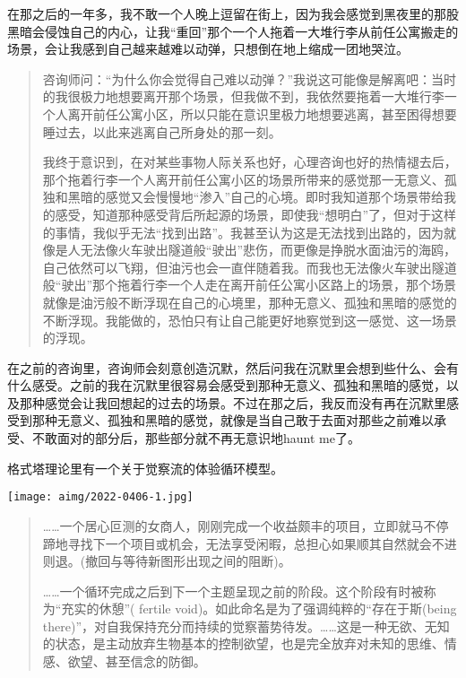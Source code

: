 在那之后的一年多，我不敢一个人晚上逗留在街上，因为我会感觉到黑夜里的那股黑暗会侵蚀自己的内心，让我“重回”那个一个人拖着一大堆行李从前任公寓搬走的场景，会让我感到自己越来越难以动弹，只想倒在地上缩成一团地哭泣。

\blockquote{
咨询师问：“为什么你会觉得自己难以动弹？”我说这可能像是解离吧：当时的我很极力地想要离开那个场景，但我做不到，我依然要拖着一大堆行李一个人离开前任公寓小区，所以只能在意识里极力地想要逃离，甚至困得想要睡过去，以此来逃离自己所身处的那一刻。

我终于意识到，在对某些事物\pozhehao{}人际关系也好，心理咨询也好\pozhehao{}的热情褪去后，那个拖着行李一个人离开前任公寓小区的场景所带来的感觉\pozhehao{}那一无意义、孤独和黑暗的感觉又会慢慢地“渗入”自己的心境。即时我知道那个场景带给我的感受，知道那种感受背后所起源的场景，即使我“想明白”了，但对于这样的事情，我似乎无法“找到出路”。我甚至认为这是无法找到出路的，因为就像是人无法像火车驶出隧道般“驶出”悲伤，而更像是挣脱水面油污的海鸥，自己依然可以飞翔，但油污也会一直伴随着我。而我也无法像火车驶出隧道般“驶出”那个拖着行李一个人走在离开前任公寓小区路上的场景，那个场景就像是油污般不断浮现在自己的心境里，那种无意义、孤独和黑暗的感觉的不断浮现。我能做的，恐怕只有让自己能更好地察觉到这一感觉、这一场景的浮现。

}

在之前的咨询里，咨询师会刻意创造沉默，然后问我在沉默里会想到些什么、会有什么感受。之前的我在沉默里很容易会感受到那种无意义、孤独和黑暗的感觉，以及那种感觉会让我回想起的过去的场景。不过在那之后，我反而没有再在沉默里感受到那种无意义、孤独和黑暗的感觉，就像是当自己敢于去面对那些之前难以承受、不敢面对的部分后，那些部分就不再无意识地haunt me了。

格式塔理论里有一个关于觉察流的体验循环模型。

\noindent\begin{minipage}{\linewidth}
    \centering
    \vspace{3pt}
    \texttt{[image: aimg/2022-0406-1.jpg]}
    \vspace{3pt}
\end{minipage}

\blockquote{
……一个居心叵测的女商人，刚刚完成一个收益颇丰的项目，立即就马不停蹄地寻找下一个项目或机会，无法享受闲暇，总担心如果顺其自然就会不进则退。(撤回与等待新图形出现之间的阻断)。

……一个循环完成之后到下一个主题呈现之前的阶段。这个阶段有时被称为“充实的休憩”( fertile void)。如此命名是为了强调纯粹的“存在于斯(being there)”，对自我保持充分而持续的觉察蓄势待发。……这是一种无欲、无知的状态，是主动放弃生物基本的控制欲望，也是完全放弃对未知的思维、情感、欲望、甚至信念的防御。

}


